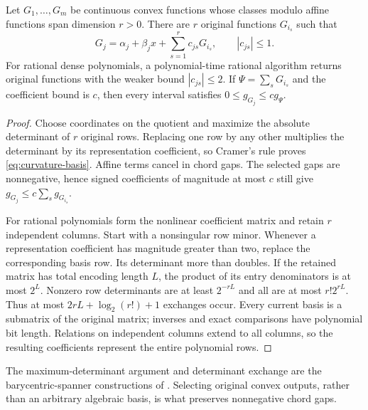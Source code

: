 \begin{lemma}\label{lem:curvature-spanner}
Let $G_1,\ldots,G_m$ be continuous convex functions whose classes modulo
affine functions span dimension $r>0$. There are $r$ original functions
$G_{i_s}$ such that
\begin{equation}\label{eq:curvature-basis}
 G_j=\alpha_j+\beta_jx+\sum_{s=1}^r c_{js}G_{i_s},
 \qquad |c_{js}|\le1.
\end{equation}
For rational dense polynomials, a polynomial-time rational algorithm
returns original functions with the weaker bound $|c_{js}|\le2$.
If $\Psi=\sum_sG_{i_s}$ and the coefficient bound is $c$, then every
interval satisfies $0\le g_{G_j}\le c g_\Psi$.
\end{lemma}
\begin{proof}
Choose coordinates on the quotient and maximize the absolute determinant
of $r$ original rows. Replacing one row by any other multiplies the
determinant by its representation coefficient, so Cramer's rule proves
\eqref{eq:curvature-basis}. Affine terms cancel in chord gaps. The selected
gaps are nonnegative, hence signed coefficients of magnitude at most $c$
still give $g_{G_j}\le c\sum_sg_{G_{i_s}}$.

For rational polynomials form the nonlinear coefficient matrix and
retain $r$ independent columns. Start with a nonsingular row minor.
Whenever a representation coefficient has magnitude greater than two,
replace the corresponding basis row. Its determinant more than doubles.
If the retained matrix has total encoding length $L$, the product of
its entry denominators is at most $2^L$. Nonzero row determinants are
at least $2^{-rL}$ and all are at most $r!2^{rL}$. Thus at most
$2rL+\log_2(r!)+1$ exchanges occur. Every current basis is a submatrix
of the original matrix; inverses and exact comparisons have polynomial
bit length. Relations on independent columns extend to all columns,
so the resulting coefficients represent the entire polynomial rows.
\end{proof}

The maximum-determinant argument and determinant exchange are the
barycentric-spanner constructions of \citet[Section 2.3,
Propositions 2.2 and 2.4]{awerbuch2004}. Selecting original convex
outputs, rather than an arbitrary algebraic basis, is what preserves
nonnegative chord gaps.

